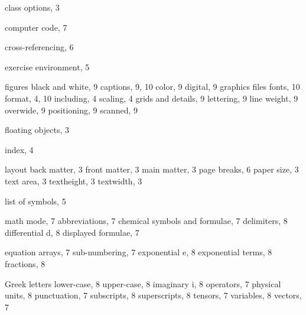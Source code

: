 \documentclass[graybox]{svmono}
\begin{document}
\def\indexname{Subject Index}


\begin{theindex}
\normalsize

\vspace*{-13pc}



\item class options, 3
\item computer code, 7
\item cross-referencing, 6
  \indexspace
\item exercise environment, 5
  \indexspace

  figures
\subitem black and white, 9
\subitem captions, 9, 10
\subitem color, 9
\subitem digital, 9
\subitem graphics files
\subsubitem fonts, 10
\subsubitem format, 4, 10
\subsubitem including, 4
\subsubitem scaling, 4
\subitem grids and details, 9
\subitem lettering, 9
\subitem line weight, 9
\subitem overwide, 9
\subitem positioning, 9
\subitem scanned, 9
\item floating objects, 3

\indexspace

\item index, 4

\indexspace

\item layout
\subitem back matter, 3
\subitem front matter, 3
\subitem main matter, 3
\subitem page breaks, 6
\subitem paper size, 3
\subitem text area, 3
\subitem textheight, 3
\subitem textwidth, 3
\item list of symbols, 5

\indexspace

\item math mode, 7
\subitem abbreviations, 7
\subitem chemical symbols and formulae, 7
\subitem delimiters, 8
\subitem differential d, 8
\subitem displayed formulae, 7

\columnbreak\vspace*{-13pc}

\subitem equation arrays, 7
\subsubitem sub-numbering, 7
\subitem exponential e, 8
\subitem exponential terms, 8
\subitem fractions, 8


\subitem Greek letters
\subsubitem lower-case, 8
\subsubitem upper-case, 8
\subitem imaginary i, 8
\subitem operators, 7
\subitem physical units, 8
\subitem punctuation, 7
\subitem subscripts, 8
\subitem superscripts, 8
\subitem tensors, 7
\subitem variables, 8
\subitem vectors, 7


\end{theindex}
\end{document}
